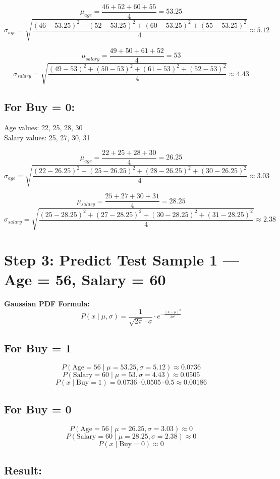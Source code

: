 \documentclass{article}
\begin{document}
\[
\mu_{age} = \frac{46 + 52 + 60 + 55}{4} = 53.25
\]
\[
\sigma_{age} = \sqrt{\frac{(46 - 53.25)^2 + (52 - 53.25)^2 + (60 - 53.25)^2 + (55 - 53.25)^2}{4}} \approx 5.12
\]

\[
\mu_{salary} = \frac{49 + 50 + 61 + 52}{4} = 53
\]
\[
\sigma_{salary} = \sqrt{\frac{(49 - 53)^2 + (50 - 53)^2 + (61 - 53)^2 + (52 - 53)^2}{4}} \approx 4.43
\]

\subsection*{For Buy = 0:}

Age values: 22, 25, 28, 30 \\
Salary values: 25, 27, 30, 31

\[
\mu_{age} = \frac{22 + 25 + 28 + 30}{4} = 26.25
\]
\[
\sigma_{age} = \sqrt{\frac{(22 - 26.25)^2 + (25 - 26.25)^2 + (28 - 26.25)^2 + (30 - 26.25)^2}{4}} \approx 3.03
\]

\[
\mu_{salary} = \frac{25 + 27 + 30 + 31}{4} = 28.25
\]
\[
\sigma_{salary} = \sqrt{\frac{(25 - 28.25)^2 + (27 - 28.25)^2 + (30 - 28.25)^2 + (31 - 28.25)^2}{4}} \approx 2.38
\]

\section*{Step 3: Predict Test Sample 1 — Age = 56, Salary = 60}

\textbf{Gaussian PDF Formula:}
\[
P(x \mid \mu, \sigma) = \frac{1}{\sqrt{2\pi} \cdot \sigma} \cdot e^{-\frac{(x - \mu)^2}{2\sigma^2}}
\]

\subsection*{For Buy = 1}

\[
P(\text{Age} = 56 \mid \mu = 53.25, \sigma = 5.12) \approx 0.0736
\]
\[
P(\text{Salary} = 60 \mid \mu = 53, \sigma = 4.43) \approx 0.0505
\]
\[
P(x \mid \text{Buy}=1) = 0.0736 \cdot 0.0505 \cdot 0.5 \approx 0.00186
\]

\subsection*{For Buy = 0}

\[
P(\text{Age} = 56 \mid \mu = 26.25, \sigma = 3.03) \approx 0
\]
\[
P(\text{Salary} = 60 \mid \mu = 28.25, \sigma = 2.38) \approx 0
\]
\[
P(x \mid \text{Buy}=0) \approx 0
\]

\subsection*{Result:}
\end{document}
